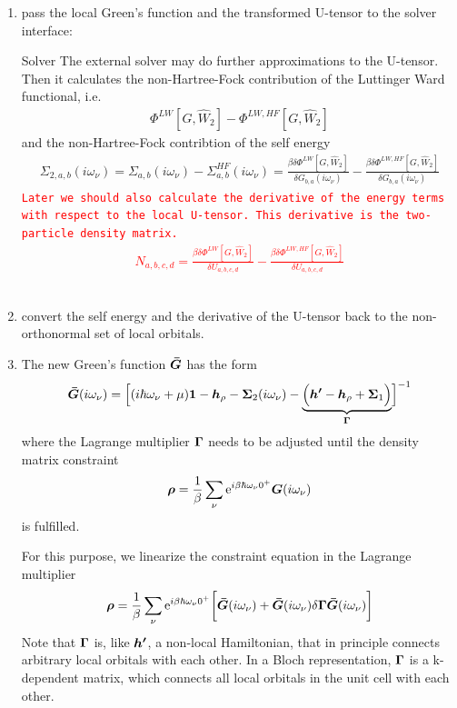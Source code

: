 \documentclass[11pt,a4paper]{report}
\newcommand{\petertt}[1]{\textcolor{red}{\texttt{#1}}}
\begin{document}
\begin{enumerate}
\item pass the local Green's function and the transformed U-tensor
 to the solver interface:
\begin{myshadowminipage}{Solver}
The external solver may do further approximations to the U-tensor.
Then it calculates the non-Hartree-Fock contribution of
the Luttinger Ward functional, i.e.
\begin{eqnarray}
\Phi^{LW}[G,\hat{W}_2]-\Phi^{LW,HF}[G,\hat{W}_2]
\end{eqnarray}
and the non-Hartree-Fock contribtion of the self energy
\begin{eqnarray}
\Sigma_{2,a,b}(i\omega_\nu)
=\Sigma_{a,b}(i\omega_\nu)-\Sigma^{HF}_{a,b}(i\omega_\nu)=
\frac{\beta\delta\Phi^{LW}[G,\hat{W}_2]}{\delta G_{b,a}(i\omega_\nu)}
-\frac{\beta\delta\Phi^{LW,HF}[G,\hat{W}_2]}{\delta G_{b,a}(i\omega_\nu)}
\end{eqnarray}
\petertt{Later we should also calculate the derivative of the energy
  terms with respect to the local U-tensor. This derivative is the
  two-particle density matrix.
\begin{eqnarray}
N_{a,b,c,d}=\frac{\beta\delta\Phi^{LW}[G,\hat{W}_2]}{\delta U_{a,b,c,d}}
-\frac{\beta\delta\Phi^{LW,HF}[G,\hat{W}_2]}{\delta U_{a,b,c,d}}
\end{eqnarray}
}
\end{myshadowminipage}
%
\item convert the self energy and the derivative of the U-tensor back
  to the non-orthonormal set of local orbitals.
%
\item The new Green's function $\bm{\bar{G}}$ has the form
\begin{eqnarray}
\bm{\bar{G}}(i\omega_\nu)=\Bigl[(i\hbar\omega_\nu+\mu)\bm{1}
-\bm{h}_\rho 
-\bm{\Sigma}_2(i\omega_\nu)
-\underbrace{\Bigl(\bm{h'}-\bm{h}_\rho+\bm{\Sigma}_1 \Bigr)}_{\bm{\Gamma}}
\Bigr]^{-1}
\end{eqnarray}
where the Lagrange multiplier $\bm{\Gamma}$ needs to be adjusted until
the density matrix constraint
\begin{eqnarray}
\bm{\rho}=\frac{1}{\beta}\sum_\nu 
\mathrm{e}^{i\beta\hbar\omega_\nu0^+}\bm{G}(i\omega_\nu)
\end{eqnarray}
is fulfilled. 

For this purpose, we linearize the constraint equation in the Lagrange
multiplier
\begin{eqnarray}
\bm{\rho}=\frac{1}{\beta}\sum_\nu 
\mathrm{e}^{i\beta\hbar\omega_\nu0^+}
\biggl[
\bm{\bar{G}}(i\omega_\nu)+\bm{\bar{G}}(i\omega_\nu)\delta\bm{\Gamma}
\bm{\bar{G}}(i\omega_\nu)\biggr]
\nonumber\\
\end{eqnarray}
Note that $\bm{\Gamma}$ is, like $\bm{h'}$, a non-local Hamiltonian,
that in principle connects arbitrary local orbitals with each
other. In a Bloch representation, $\bm{\Gamma}$ is a k-dependent matrix,
which connects all local orbitals in the unit cell with each other.


\end{enumerate}
\end{document}
